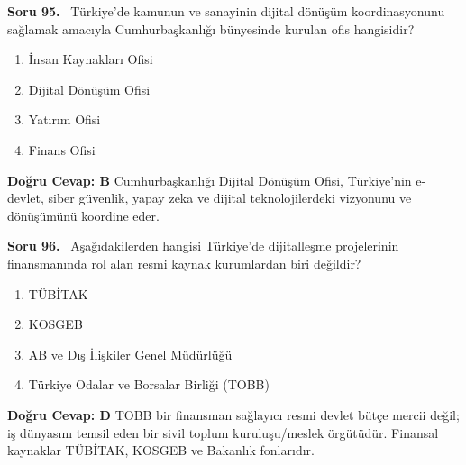 \documentclass[11pt,a4paper,openany]{book}
\begin{document}
\needspace{5cm}
\vspace{8pt}
\noindent\textbf{\large\sffamily Soru 95.} \ Türkiye'de kamunun ve sanayinin dijital dönüşüm koordinasyonunu sağlamak amacıyla Cumhurbaşkanlığı bünyesinde kurulan ofis hangisidir?
\begin{enumerate}[label=\Alph*), leftmargin=25pt, topsep=4pt, itemsep=2pt]
    \item İnsan Kaynakları Ofisi
    \item Dijital Dönüşüm Ofisi
    \item Yatırım Ofisi
    \item Finans Ofisi
\end{enumerate}
\vspace{4pt}
\begin{tcolorbox}[title=Cevap ve Açıklama, colback=gray!3!white, colframe=primarycolor!90!black, arc=2mm, fonttitle=\bfseries\sffamily, top=6pt, bottom=6pt]
    \textbf{Doğru Cevap: B}
    \vspace{2pt}
    Cumhurbaşkanlığı Dijital Dönüşüm Ofisi, Türkiye'nin e-devlet, siber güvenlik, yapay zeka ve dijital teknolojilerdeki vizyonunu ve dönüşümünü koordine eder.
\end{tcolorbox}
\vspace{10pt}

\needspace{5cm}
\vspace{8pt}
\noindent\textbf{\large\sffamily Soru 96.} \ Aşağıdakilerden hangisi Türkiye'de dijitalleşme projelerinin finansmanında rol alan resmi kaynak kurumlardan biri değildir?
\begin{enumerate}[label=\Alph*), leftmargin=25pt, topsep=4pt, itemsep=2pt]
    \item TÜBİTAK
    \item KOSGEB
    \item AB ve Dış İlişkiler Genel Müdürlüğü
    \item Türkiye Odalar ve Borsalar Birliği (TOBB)
\end{enumerate}
\vspace{4pt}
\begin{tcolorbox}[title=Cevap ve Açıklama, colback=gray!3!white, colframe=primarycolor!90!black, arc=2mm, fonttitle=\bfseries\sffamily, top=6pt, bottom=6pt]
    \textbf{Doğru Cevap: D}
    \vspace{2pt}
    TOBB bir finansman sağlayıcı resmi devlet bütçe mercii değil; iş dünyasını temsil eden bir sivil toplum kuruluşu/meslek örgütüdür. Finansal kaynaklar TÜBİTAK, KOSGEB ve Bakanlık fonlarıdır.
\end{tcolorbox}
\vspace{10pt}
\end{document}
